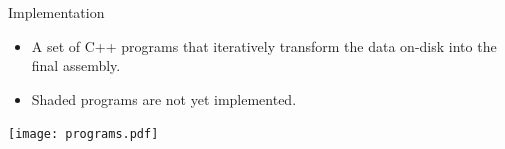 \documentclass[xcolor=dvipsnames]{beamer}
\begin{document}
\begin{frame}{Implementation}
	\begin{minipage}{0.3\textwidth}
		\begin{itemize}
			\item A set of C++ programs that iteratively transform
			the data on-disk into the final assembly.
			\item Shaded programs are not yet implemented.
		\end{itemize}
	\end{minipage}
	\begin{minipage}{0.67\textwidth}
		\texttt{[image: programs.pdf]}
	\end{minipage}
\end{frame}
\end{document}
